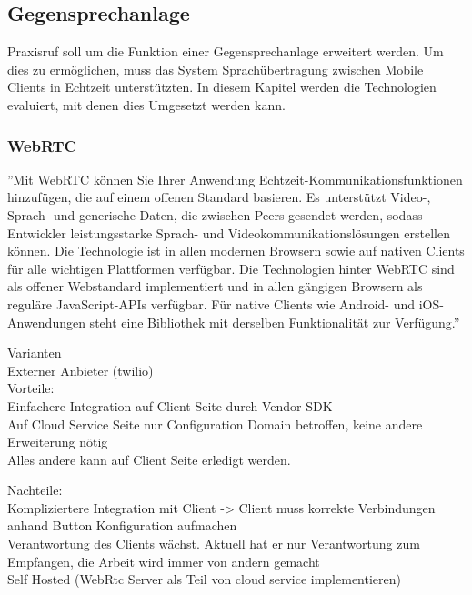 \subsection{Gegensprechanlage}

Praxisruf soll um die Funktion einer Gegensprechanlage erweitert werden.
Um dies zu ermöglichen, muss das System Sprachübertragung zwischen Mobile Clients in Echtzeit unterstützten.
In diesem Kapitel werden die Technologien evaluiert, mit denen dies Umgesetzt werden kann.

\subsubsection{WebRTC}

''Mit WebRTC können Sie Ihrer Anwendung Echtzeit-Kommunikationsfunktionen hinzufügen, die auf einem offenen Standard basieren.
Es unterstützt Video-, Sprach- und generische Daten, die zwischen Peers gesendet werden, sodass Entwickler leistungsstarke Sprach- und Videokommunikationslösungen erstellen können.
Die Technologie ist in allen modernen Browsern sowie auf nativen Clients für alle wichtigen Plattformen verfügbar.
Die Technologien hinter WebRTC sind als offener Webstandard implementiert und in allen gängigen Browsern als reguläre JavaScript-APIs verfügbar.
Für native Clients wie Android- und iOS-Anwendungen steht eine Bibliothek mit derselben Funktionalität zur Verfügung.''\cite{webrtc}


Varianten \\
Externer Anbieter (twilio) \\

Vorteile: \\

Einfachere Integration auf Client Seite durch Vendor SDK \\
Auf Cloud Service Seite nur Configuration Domain betroffen, keine andere Erweiterung nötig \\
Alles andere kann auf Client Seite erledigt werden.


Nachteile: \\
Kompliziertere Integration mit Client -> Client muss korrekte Verbindungen anhand Button Konfiguration aufmachen \\
Verantwortung des Clients wächst. Aktuell hat er nur Verantwortung zum Empfangen, die Arbeit wird immer von andern gemacht \\


Self Hosted (WebRtc Server als Teil von cloud service implementieren) \\


